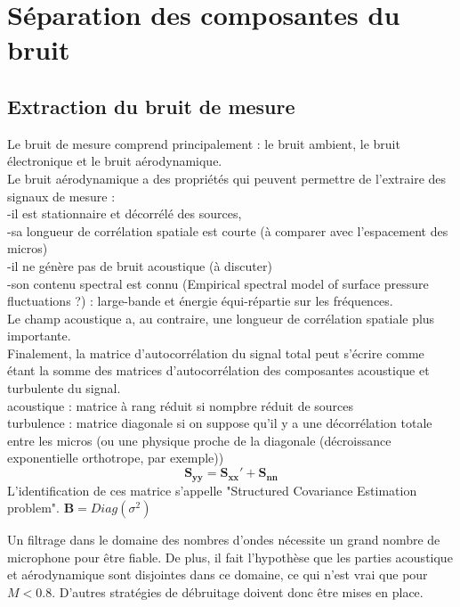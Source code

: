 \chapter{Séparation des composantes du bruit \label{debruitage}}

\section{Extraction du bruit de mesure}
Le bruit de mesure comprend principalement : le bruit ambient, le bruit électronique et le bruit aérodynamique.\\


Le bruit aérodynamique a des propriétés qui peuvent permettre de l'extraire des signaux de mesure : \\
-il est stationnaire et décorrélé des sources,\\
-sa longueur de corrélation spatiale est courte (à comparer avec l'espacement des micros) \\
-il ne génère pas de bruit acoustique (à discuter)\\
-son contenu spectral est connu (Empirical spectral model of surface pressure fluctuations ?) : large-bande et énergie équi-répartie sur les fréquences.\\

Le champ acoustique a, au contraire, une longueur de corrélation spatiale plus importante.\\

Finalement, la matrice d'autocorrélation du signal total peut s'écrire comme étant la somme des matrices d'autocorrélation des composantes acoustique et turbulente du signal. \\

acoustique : matrice à rang réduit si  nompbre réduit de sources\\
turbulence : matrice diagonale si on suppose qu'il y a une décorrélation totale entre les micros (ou une physique proche de la diagonale (décroissance exponentielle orthotrope, par exemple))\\

\begin{equation}
\bm{S_{yy}} = \bm{S_{xx}}' + \bm{S_{nn}}
\end{equation}
L'identification de ces matrice s'appelle "Structured Covariance Estimation problem".
$\bm{B}=Diag(\sigma^{2})$

Un filtrage dans le domaine des nombres d'ondes nécessite un grand nombre de microphone pour être fiable. De plus, il fait l'hypothèse que les parties acoustique et aérodynamique sont disjointes dans ce domaine, ce qui n'est vrai que pour $M<0.8$. D'autres stratégies de débruitage doivent donc être mises en place.

